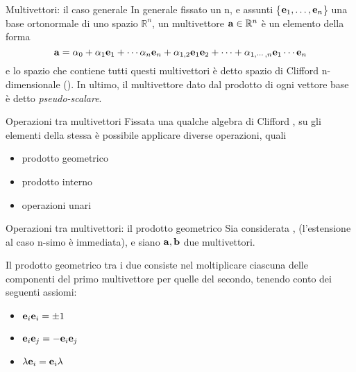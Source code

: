 \begin{frame}{Multivettori: il caso generale}
    In generale fissato un n, e assunti \{\(\mathbf{e}_{1}, \ldots, \mathbf{e}_{n}\)\}
    una base ortonormale di uno spazio \(\mathbb{R}^{n}\),
    un multivettore \(\mathbf{a} \in \mathbb{R}^{n}\) è un elemento della forma
    \[
        \mathbf{a} = \alpha_{0} + \alpha_{1}\mathbf{e}_{1} + \cdots \alpha_{n}\mathbf{e}_{n}
            + \alpha_{1,2}\mathbf{e}_{1}\mathbf{e}_{2} + \cdots 
            + \alpha_{1, \cdots, n}\mathbf{e}_{1} \cdots \mathbf{e}_{n}
    \]
    e lo spazio che contiene tutti questi multivettori è detto spazio di Clifford
    n-dimensionale (\Clifford). 
    In ultimo, il multivettore dato dal prodotto di ogni vettore base è detto
    \emph{pseudo-scalare}.
\end{frame}
\begin{frame}{Operazioni tra multivettori}
    Fissata una qualche algebra di Clifford \Clifford, 
    su gli elementi della stessa è possibile applicare diverse operazioni,
    quali 
    \begin{itemize}
        \item prodotto geometrico
        \item prodotto interno
        \item operazioni unari
    \end{itemize}
\end{frame}
\begin{frame}{Operazioni tra multivettori: il prodotto geometrico}
    Sia considerata \Clifford[2], (l'estensione al caso n-simo è immediata),
    e siano \(\mathbf{a}, \mathbf{b}\) due multivettori.

    Il prodotto geometrico tra i due consiste nel moltiplicare ciascuna delle 
    componenti del primo multivettore per quelle del secondo, 
    tenendo conto dei seguenti assiomi:
    \begin{itemize}
        \item \(\mathbf{e}_{i}\mathbf{e}_{i} = \pm 1\)
        \item \(\mathbf{e}_{i}\mathbf{e}_{j} = -\mathbf{e}_{i}\mathbf{e}_{j}\)
        \item \(\lambda\mathbf{e}_{i} = \mathbf{e}_{i}\lambda\)
    \end{itemize}
\end{frame}
